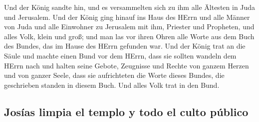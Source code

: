  Und der König sandte hin, und es versammelten sich zu ihm
alle Ältesten in Juda und Jerusalem.  Und der König ging
hinauf ins Haus des HErrn und alle Männer von Juda und alle Einwohner zu
Jerusalem mit ihm, Priester und Propheten, und alles Volk, klein und
groß; und man las vor ihren Ohren alle Worte aus dem Buch des Bundes,
das im Hause des HErrn gefunden war.  Und der König trat
an die Säule und machte einen Bund vor dem HErrn, dass sie sollten
wandeln dem HErrn nach und halten seine Gebote, Zeugnisse und Rechte von
ganzem Herzen und von ganzer Seele, dass sie aufrichteten die Worte
dieses Bundes, die geschrieben standen in diesem Buch. Und alles Volk
trat in den Bund.

\hypertarget{josuxedas-limpia-el-templo-y-todo-el-culto-puxfablico}{%
\subsection{Josías limpia el templo y todo el culto
público}\label{josuxedas-limpia-el-templo-y-todo-el-culto-puxfablico}}


